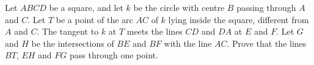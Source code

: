 Let $ABCD$ be a square, and let $k$ be the circle with centre $B$ passing through $A$ and $C$. Let $T$ be a point of the arc $AC$ of $k$ lying inside the square, different from $A$ and $C$. The tangent to $k$ at $T$ meets the lines $CD$ and $DA$ at $E$ and $F$. Let $G$ and $H$ be the intersections of $BE$ and $BF$ with the line $AC$. Prove that the lines $BT$, $EH$ and $FG$ pass through one point.
